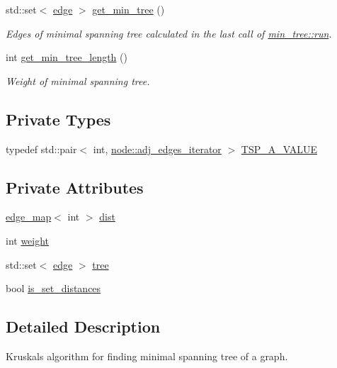 \begin{DoxyCompactItemize}
std\+::set$<$ \mbox{\hyperlink{classedge}{edge}} $>$ \mbox{\hyperlink{classmin__tree_a8491dfab8dc24f0177dec5207fb3d2e1}{get\+\_\+min\+\_\+tree}} ()
\begin{DoxyCompactList}\small\item\em Edges of minimal spanning tree calculated in the last call of \mbox{\hyperlink{classmin__tree_ac025e8dad0db7a6a1e0e7b476b547802}{min\+\_\+tree\+::run}}. \end{DoxyCompactList}\item 
int \mbox{\hyperlink{classmin__tree_a8ca03d32ba55a9eb20b52fcb0e6fa6a5}{get\+\_\+min\+\_\+tree\+\_\+length}} ()
\begin{DoxyCompactList}\small\item\em Weight of minimal spanning tree. \end{DoxyCompactList}\end{DoxyCompactItemize}
\subsection*{Private Types}
\begin{DoxyCompactItemize}
\item 
typedef std\+::pair$<$ int, \mbox{\hyperlink{classnode_abdd49248203010f2d5432dfef22d017a}{node\+::adj\+\_\+edges\+\_\+iterator}} $>$ \mbox{\hyperlink{classmin__tree_af83e196caf3ebcdc9035dc42aee581ee}{T\+S\+P\+\_\+\+A\+\_\+\+V\+A\+L\+UE}}
\end{DoxyCompactItemize}
\subsection*{Private Attributes}
\begin{DoxyCompactItemize}
\item 
\mbox{\hyperlink{classedge__map}{edge\+\_\+map}}$<$ int $>$ \mbox{\hyperlink{classmin__tree_ae612767aa8e3eb3bedd1dadd7c68f99c}{dist}}
\item 
int \mbox{\hyperlink{classmin__tree_a52112da027b950d45c177117444c5010}{weight}}
\item 
std\+::set$<$ \mbox{\hyperlink{classedge}{edge}} $>$ \mbox{\hyperlink{classmin__tree_a138e9248f851ee2562df6644626a1f0b}{tree}}
\item 
bool \mbox{\hyperlink{classmin__tree_a7c2ec16bd1799571bc057630262a3a03}{is\+\_\+set\+\_\+distances}}
\end{DoxyCompactItemize}


\subsection{Detailed Description}
Kruskal\textquotesingle{}s algorithm for finding minimal spanning tree of a graph. 

